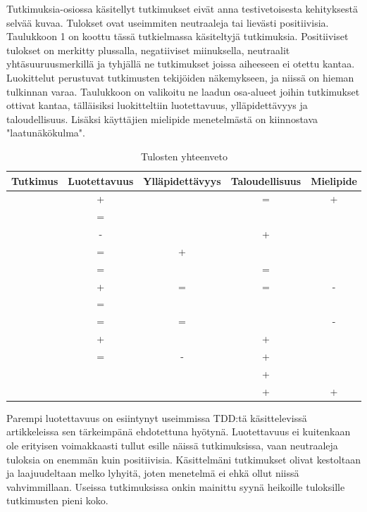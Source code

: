 \documentclass[finnish]{tktltiki2}
\theoremstyle{definition}
\theoremstyle{remark}
\begin{document}
Tutkimuksia-osiossa käsitellyt tutkimukset eivät anna testivetoisesta kehityksestä selvää kuvaa. Tulokset ovat useimmiten neutraaleja tai lievästi positiivisia.
  Taulukkoon 1 on koottu tässä tutkielmassa käsiteltyjä tutkimuksia. Positiiviset tulokset on merkitty plussalla, negatiiviset miinuksella, neutraalit yhtäsuuruusmerkillä ja tyhjällä ne tutkimukset joissa aiheeseen ei otettu kantaa. Luokittelut perustuvat tutkimusten tekijöiden näkemykseen, ja niissä on hieman tulkinnan varaa. Taulukkoon on valikoitu ne laadun osa-alueet joihin tutkimukset ottivat kantaa, tälläisiksi luokitteltiin luotettavuus, ylläpidettävyys ja taloudellisuus. Lisäksi käyttäjien mielipide menetelmästä on kiinnostava "laatunäkökulma".

\begin{table}
\begin{tabular}{ l  c  c  c  c }
\toprule
  Tutkimus & Luotettavuus & Ylläpidettävyys & Taloudellisuus & Mielipide \\
\midrule
\cite{George04} 	& + &  & = & + \\ 
\cite{Wilkerson12} 	& = &  &   &   \\ 
\cite{Erdogmus05} 	& - &  	& + &   \\ 
\cite{Causevic12} 	& = & + &   &   \\
\cite{Canfora06} 	& = &  & = &   \\ 
\cite{Pancur11} 	& + & = & = & - \\
\cite{Wilkerson12} 	& = &  &   &   \\ 
\cite{Munir14} 	& = & = &   & - \\ 
\cite{Nagappan08} 	& + &  & + &   \\ 
\cite{Siniaalto07} 	& = & - & + &   \\ 
\cite{Madeyski07} 	&   &   & + &   \\ 
\cite{Latorre14}	&   &   & + & + \\ 
\bottomrule
\end{tabular}
\caption{Tulosten yhteenveto}
\end{table}


Parempi luotettavuus on esiintynyt useimmissa TDD:tä käsittelevissä artikkeleissa sen tärkeimpänä ehdotettuna hyötynä. Luotettavuus ei kuitenkaan ole erityisen voimakkaasti tullut esille näissä tutkimuksissa, vaan neutraaleja tuloksia on enemmän kuin positiivisia. Käsittelmäni tutkimukset olivat  kestoltaan ja laajuudeltaan melko lyhyitä, joten menetelmä ei ehkä ollut niissä vahvimmillaan. Useissa tutkimuksissa onkin mainittu syynä heikoille tuloksille tutkimusten pieni koko. 
\end{document}
